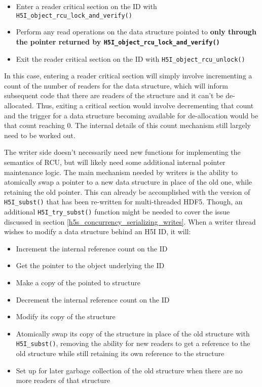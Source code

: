 \documentclass[../HDF5_RFC.tex]{subfiles}
\begin{document}
\begin{itemize}
    \item Enter a reader critical section on the ID with \texttt{H5I\_object\_rcu\_lock\_and\_verify()}
    \item Perform any read operations on the data structure pointed to \textbf{only through the pointer
          returned by \texttt{H5I\_object\_rcu\_lock\_and\_verify()}}
    \item Exit the reader critical section on the ID with \texttt{H5I\_object\_rcu\_unlock()}
\end{itemize}

In this case, entering a reader critical section will simply involve incrementing a count of the number
of readers for the data structure, which will inform subsequent code that there are readers of the
structure and it can't be de-allocated. Thus, exiting a critical section would involve decrementing
that count and the trigger for a data structure becoming available for de-allocation would be that
count reaching 0. The internal details of this count mechanism still largely need to be worked out.

The writer side doesn't necessarily need new functions for implementing the semantics of RCU, but will
likely need some additional internal pointer maintenance logic. The main mechanism needed by writers is
the ability to atomically swap a pointer to a new data structure in place of the old one, while retaining
the old pointer. This can already be accomplished with the version of \texttt{H5I\_subst()} that has been
re-written for multi-threaded HDF5. Though, an additional \texttt{H5I\_try\_subst()} function might be
needed to cover the issue discussed in section \ref{h5s_concurrency_serializing_writes}. When a writer
thread wishes to modify a data structure behind an H5I ID, it will:

\begin{itemize}
    \item Increment the internal reference count on the ID
    \item Get the pointer to the object underlying the ID
    \item Make a copy of the pointed to structure
    \item Decrement the internal reference count on the ID
    \item Modify its copy of the structure
    \item Atomically swap its copy of the structure in place of the old structure with \texttt{H5I\_subst()},
          removing the ability for new readers to get a reference to the old structure while still
          retaining its own reference to the structure
    \item Set up for later garbage collection of the old structure when there are no more readers of that
          structure
\end{itemize}
\end{document}
